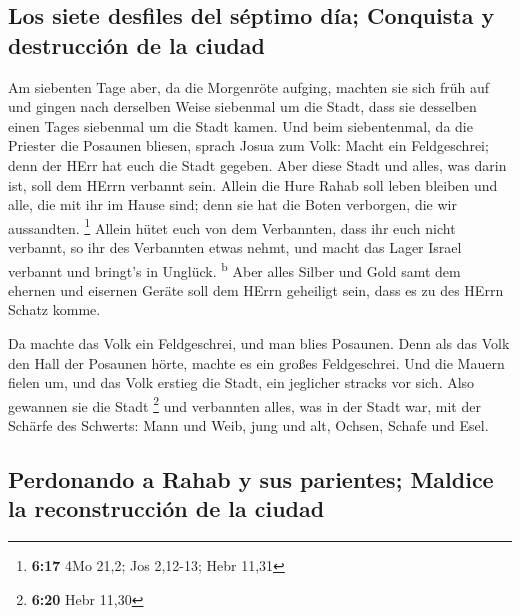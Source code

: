 \hypertarget{los-siete-desfiles-del-suxe9ptimo-duxeda-conquista-y-destrucciuxf3n-de-la-ciudad}{%
\subsection{Los siete desfiles del séptimo día; Conquista y destrucción
de la
ciudad}\label{los-siete-desfiles-del-suxe9ptimo-duxeda-conquista-y-destrucciuxf3n-de-la-ciudad}}

 Am siebenten Tage aber, da die Morgenröte aufging,
machten sie sich früh auf und gingen nach derselben Weise siebenmal um
die Stadt, dass sie desselben einen Tages siebenmal um die Stadt kamen.
 Und beim siebentenmal, da die Priester die Posaunen
bliesen, sprach Josua zum Volk: Macht ein Feldgeschrei; denn der HErr
hat euch die Stadt gegeben.  Aber diese Stadt und alles,
was darin ist, soll dem HErrn verbannt sein. Allein die Hure Rahab soll
leben bleiben und alle, die mit ihr im Hause sind; denn sie hat die
Boten verborgen, die wir aussandten. \footnote{\textbf{6:17} 4Mo 21,2;
  Jos 2,12-13; Hebr 11,31}  Allein hütet euch von dem
Verbannten, dass ihr euch nicht verbannt, so ihr des Verbannten etwas
nehmt, und macht das Lager Israel verbannt und bringt's in Unglück.
\textsuperscript{b}  Aber alles Silber und Gold samt dem
ehernen und eisernen Geräte soll dem HErrn geheiligt sein, dass es zu
des HErrn Schatz komme.

 Da machte das Volk ein Feldgeschrei, und man blies
Posaunen. Denn als das Volk den Hall der Posaunen hörte, machte es ein
großes Feldgeschrei. Und die Mauern fielen um, und das Volk erstieg die
Stadt, ein jeglicher stracks vor sich. Also gewannen sie die Stadt
\footnote{\textbf{6:20} Hebr 11,30}  und verbannten
alles, was in der Stadt war, mit der Schärfe des Schwerts: Mann und
Weib, jung und alt, Ochsen, Schafe und Esel.

\hypertarget{perdonando-a-rahab-y-sus-parientes-maldice-la-reconstrucciuxf3n-de-la-ciudad}{%
\subsection{Perdonando a Rahab y sus parientes; Maldice la
reconstrucción de la
ciudad}\label{perdonando-a-rahab-y-sus-parientes-maldice-la-reconstrucciuxf3n-de-la-ciudad}}

